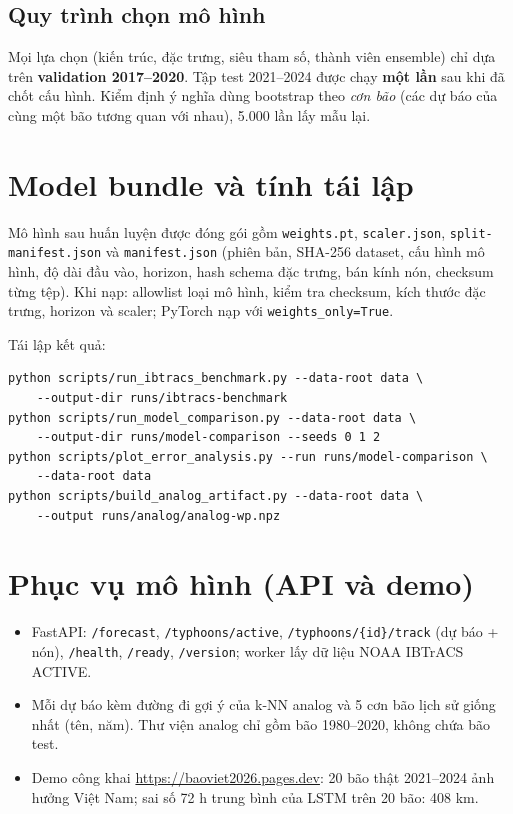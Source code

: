 \documentclass[12pt,a4paper]{article}
\begin{document}
\subsection{Quy trình chọn mô hình}
Mọi lựa chọn (kiến trúc, đặc trưng, siêu tham số, thành viên ensemble) chỉ dựa trên
\textbf{validation 2017--2020}. Tập test 2021--2024 được chạy \textbf{một lần}
sau khi đã chốt cấu hình. Kiểm định ý nghĩa dùng bootstrap theo \emph{cơn bão}
(các dự báo của cùng một bão tương quan với nhau), 5.000 lần lấy mẫu lại.

\section{Model bundle và tính tái lập}
Mô hình sau huấn luyện được đóng gói gồm \texttt{weights.pt}, \texttt{scaler.json},
\texttt{split-manifest.json} và \texttt{manifest.json} (phiên bản, SHA-256 dataset,
cấu hình mô hình, độ dài đầu vào, horizon, hash schema đặc trưng, bán kính nón,
checksum từng tệp). Khi nạp: allowlist loại mô hình, kiểm tra checksum, kích thước
đặc trưng, horizon và scaler; PyTorch nạp với \texttt{weights\_only=True}.

Tái lập kết quả:
{\small
\begin{verbatim}
python scripts/run_ibtracs_benchmark.py --data-root data \
    --output-dir runs/ibtracs-benchmark
python scripts/run_model_comparison.py --data-root data \
    --output-dir runs/model-comparison --seeds 0 1 2
python scripts/plot_error_analysis.py --run runs/model-comparison \
    --data-root data
python scripts/build_analog_artifact.py --data-root data \
    --output runs/analog/analog-wp.npz
\end{verbatim}}

\section{Phục vụ mô hình (API và demo)}
\begin{itemize}
  \item FastAPI: \texttt{/forecast}, \texttt{/typhoons/active},
        \texttt{/typhoons/\{id\}/track} (dự báo + nón), \texttt{/health},
        \texttt{/ready}, \texttt{/version}; worker lấy dữ liệu NOAA IBTrACS ACTIVE.
  \item Mỗi dự báo kèm đường đi gợi ý của k-NN analog và 5 cơn bão lịch sử giống nhất
        (tên, năm). Thư viện analog chỉ gồm bão 1980--2020, không chứa bão test.
  \item Demo công khai \url{https://baoviet2026.pages.dev}: 20 bão thật 2021--2024
        ảnh hưởng Việt Nam; sai số 72 h trung bình của LSTM trên 20 bão: 408 km.
\end{itemize}
\end{document}
